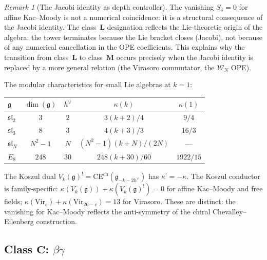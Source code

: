 \documentclass[11pt,reqno]{amsart}
\theoremstyle{definition}
\theoremstyle{remark}
\newtheorem{remark}[theorem]{Remark}
\newcommand{\cW}{\mathcal{W}}
\newcommand{\fg}{\mathfrak{g}}
\newcommand{\Vir}{\mathrm{Vir}}
\numberwithin{equation}{section}
\begin{document}
\begin{remark}[The Jacobi identity as depth
controller]\label{rem:jacobi-depth}
The vanishing $S_4 = 0$ for affine Kac--Moody is not a
numerical coincidence: it is a structural consequence of the
Jacobi identity. The class~$\mathbf{L}$ designation
reflects the Lie-theoretic origin of the algebra: the tower
terminates because the Lie bracket closes (Jacobi), not
because of any numerical cancellation in the OPE
coefficients. This explains why the transition from
class~$\mathbf{L}$ to class~$\mathbf{M}$ occurs precisely
when the Jacobi identity is replaced by a more general
relation (the Virasoro commutator, the $\cW_N$ OPE).
\end{remark}

The modular characteristics for small Lie algebras at
$k = 1$:

\begin{center}
\renewcommand{\arraystretch}{1.2}
\begin{tabular}{lcccc}
\toprule
$\fg$ & $\dim(\fg)$ & $h^\vee$
 & $\kappa(k)$ & $\kappa(1)$ \\
\midrule
$\mathfrak{sl}_2$ & $3$ & $2$
 & $3(k+2)/4$ & $9/4$ \\[2pt]
$\mathfrak{sl}_3$ & $8$ & $3$
 & $4(k+3)/3$ & $16/3$ \\[2pt]
$\mathfrak{sl}_N$ & $N^2{-}1$ & $N$
 & $(N^2{-}1)(k{+}N)/(2N)$ & --- \\[2pt]
$E_8$ & $248$ & $30$
 & $248(k{+}30)/60$ & $1922/15$ \\
\bottomrule
\end{tabular}
\end{center}

\noindent The Koszul dual
$V_k(\fg)^! = \mathrm{CE}^{\mathrm{ch}}(\fg_{-k-2h^\vee})$
has $\kappa^! = -\kappa$. The Koszul conductor is
family-specific:
$\kappa(V_k(\fg)) + \kappa(V_k(\fg)^!) = 0$ for affine
Kac--Moody and free fields;
$\kappa(\Vir_c) + \kappa(\Vir_{26-c}) = 13$ for Virasoro.
These are distinct: the vanishing for Kac--Moody reflects
the anti-symmetry of the chiral Chevalley--Eilenberg
construction.


\subsection{Class $\mathbf{C}$:
$\beta\gamma$}\label{subsec:betagamma}
\end{document}
